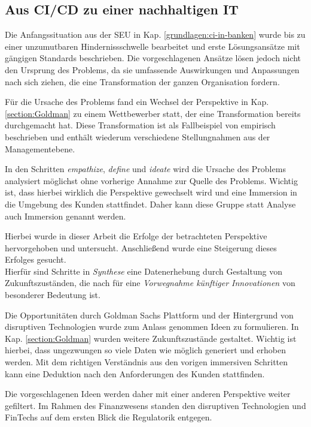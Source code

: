 \subsection{Aus CI/CD zu einer nachhaltigen IT}
Die Anfangssituation aus der \ac{SEU} in Kap. \ref{grundlagen:ci-in-banken} wurde bis zu einer unzumutbaren Hindernissschwelle bearbeitet und erste Lösungsansätze mit gängigen Standards beschrieben. Die vorgeschlagenen Ansätze lösen jedoch nicht den Ursprung des Problems, da sie umfassende Auswirkungen und Anpassungen nach sich ziehen, die eine Transformation der ganzen Organisation fordern. 

Für die Ursache des Problems fand ein Wechsel der Perspektive in Kap. \ref{section:Goldman} zu einem Wettbewerber statt, der eine Transformation bereits durchgemacht hat. Diese Transformation ist als Fallbeispiel von \citet{Gupta:2017} empirisch beschrieben und enthält wiederum verschiedene Stellungnahmen aus der Managementebene.

In den Schritten \emph{empathize}, \emph{define} und \emph{ideate} wird die Ursache des Problems analysiert möglichst ohne vorherige Annahme zur Quelle des Problems. Wichtig ist, dass hierbei wirklich die Perspektive gewechselt wird und eine Immersion in die Umgebung des Kunden stattfindet. Daher kann diese Gruppe statt Analyse \cite{yüksel:digit} auch Immersion genannt werden. 

Hierbei wurde in dieser Arbeit die Erfolge der betrachteten Perspektive hervorgehoben und untersucht. Anschließend wurde eine Steigerung dieses Erfolges gesucht.
\medskip
\\
Hierfür sind Schritte in \emph{Synthese} eine Datenerhebung \cite[S. 61]{yüksel:digit} durch Gestaltung von Zukunftszuständen, die nach \citet[S. 14]{Alt2017} für eine \emph{Vorwegnahme künftiger Innovationen} von besonderer Bedeutung ist. 

Die Opportunitäten durch Goldman Sachs Plattform \cite{Gupta:2017} und der Hintergrund von disruptiven Technologien \cite{Fernandez:2020} wurde zum Anlass genommen Ideen zu formulieren. In Kap. \ref{section:Goldman} wurden weitere Zukunftszustände gestaltet.
Wichtig ist hierbei, dass ungezwungen so viele Daten wie möglich generiert und erhoben werden. Mit dem richtigen Verständnis aus den vorigen immersiven Schritten kann eine Deduktion nach den Anforderungen des Kunden stattfinden. 

Die vorgeschlagenen Ideen werden daher mit einer anderen Perspektive weiter gefiltert. Im Rahmen des Finanzwesens standen den disruptiven Technologien und FinTechs auf dem ersten Blick die Regulatorik entgegen.

